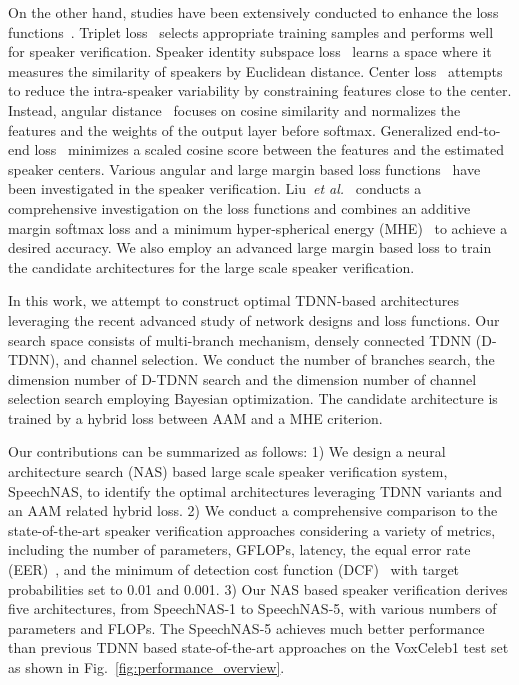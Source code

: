 \documentclass{article}
\def\etal{\emph{et al.}}
\begin{document}
On the other hand, studies have been extensively conducted to enhance the loss functions~\cite{liu2019large}. Triplet loss~\cite{zhang2017end} selects appropriate training samples and performs well for speaker verification. Speaker identity subspace loss~\cite{ji2018end} learns a space where it measures the similarity of speakers by Euclidean distance. Center loss~\cite{li2018deep,yadav2018learning} attempts to reduce the intra-speaker variability by constraining features close to the center. Instead, angular distance~\cite{zhang2019utd} focuses on cosine similarity and normalizes the features and the weights of the output layer before softmax. Generalized end-to-end loss~\cite{wan2018generalized} minimizes a scaled cosine score between the features and the estimated speaker centers. Various angular and large margin based loss functions~\cite{huang2018angular,bhattacharya2019adapting,xie2019utterance,li2019boundary} have been investigated in the speaker verification. Liu~\etal~\cite{liu2019large} conducts a comprehensive investigation on the loss functions and combines an additive margin softmax loss and a minimum hyper-spherical energy (MHE)~\cite{liu2018learning} to achieve a desired accuracy. We also employ an advanced large margin based loss to train the candidate architectures for the large scale speaker verification.

In this work, we attempt to construct optimal TDNN-based architectures leveraging the recent advanced study of network designs and loss functions. Our search space consists of multi-branch mechanism, densely connected TDNN (D-TDNN), and channel selection. We conduct the number of branches search, the dimension number of D-TDNN search and the dimension number of channel selection search employing Bayesian optimization. The candidate architecture is trained by a hybrid loss between AAM and a MHE criterion.

Our contributions can be summarized as follows: 1) We design a neural architecture search (NAS) based large scale speaker verification system, SpeechNAS, to identify the optimal architectures leveraging TDNN variants and an AAM related hybrid loss. 2) We conduct a comprehensive comparison to the state-of-the-art speaker verification approaches considering a variety of metrics, including the number of parameters, GFLOPs, latency, the equal error rate (EER)~\cite{snyder2018x}, and the minimum of detection cost function (DCF)~\cite{snyder2018x} with target probabilities set to 0.01 and 0.001. 3) Our NAS based speaker verification derives five architectures, from SpeechNAS-1 to SpeechNAS-5, with various numbers of parameters and FLOPs. The SpeechNAS-5 achieves much better performance than previous TDNN based state-of-the-art approaches on the {\selectfont VoxCeleb1} test set as shown in Fig.~\ref{fig:performance_overview}.
\end{document}
